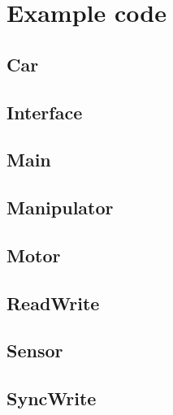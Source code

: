 \documentclass{book}
\begin{document}
\chapter{Example code}

\section{Car}


\section{Interface}


\section{Main}


\section{Manipulator}


\section{Motor}


\section{ReadWrite}


\section{Sensor}


\section{SyncWrite}

\end{document}
